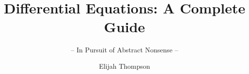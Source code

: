 \documentclass[graybox,envcountchap,sectrefs]{style/svmono}
\begin{document}
\author{Elijah Thompson}
\title{Differential Equations: A Complete Guide}
\subtitle{-- In Pursuit of Abstract Nonsense --}
\maketitle

\frontmatter%

%
%

%

\tableofcontents

%


\mainmatter%



















\backmatter%

%
%
\printindex

\end{document}
